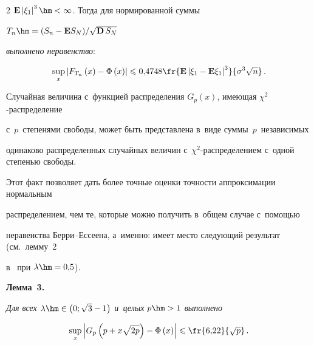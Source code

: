 \begin{multicols}{2}
{$\mathbf{E}\left|\xi_{1}\right|^{3}\hm<\infty$. Тогда  для нормированной суммы}


$


T_{n}\hm=


{(S_{n}-\mathbf{E}{S_{N}})}/{\sqrt{\mathbf{D}\,{S_{N}}}}


$


\textit{выполнено неравенство}:


$$


\sup\limits_{x}{\left|F_{T_{n}}\left(x\right)-\Phi\left(x\right)\right|}\leqslant 


0{,}4748\fr{\mathbf{E}\left|\xi_{1}-


\mathbf{E}\xi_{1}\right|^{3}}{\sigma^{3}\sqrt{n}}\,.


$$








Случайная величина с~функцией распределения $G_{p}(x)$, имеющая   $\chi^{2}$-рас\-пре\-де\-ле\-ние 


с~$p$~степенями свободы, может быть представлена в~виде суммы~$p$~независимых 


одинаково распределенных случайных величин с~$\chi^{2}$-рас\-пре\-де\-ле\-ни\-ем с~одной степенью свободы.


Этот факт позволяет дать более точные оценки точ\-ности аппроксимации нормальным 


распределением, чем те, которые можно получить в~общем случае с~помощью


неравенства Бер\-ри--Ес\-се\-ена, а~именно: имеет место следующий результат (см.\ лемму~2 


в~\cite{lit:Kavaguchi} при $\lambda\hm=0{,}5$).





\smallskip





\noindent


\textbf{Лемма~3.}


\textit{Для всех $\lambda\hm\in\left(0; \sqrt{3}-1\right)$ и~целых $p\hm>1$ выполнено}


    $$


    \sup\limits_{x}{\left|G_{p}\left(p+x\sqrt{2p}\right)-


\Phi\left(x\right)\right|}\leqslant \fr{6{,}22}{\sqrt{p}}\,.


    $$






\end{multicols}
